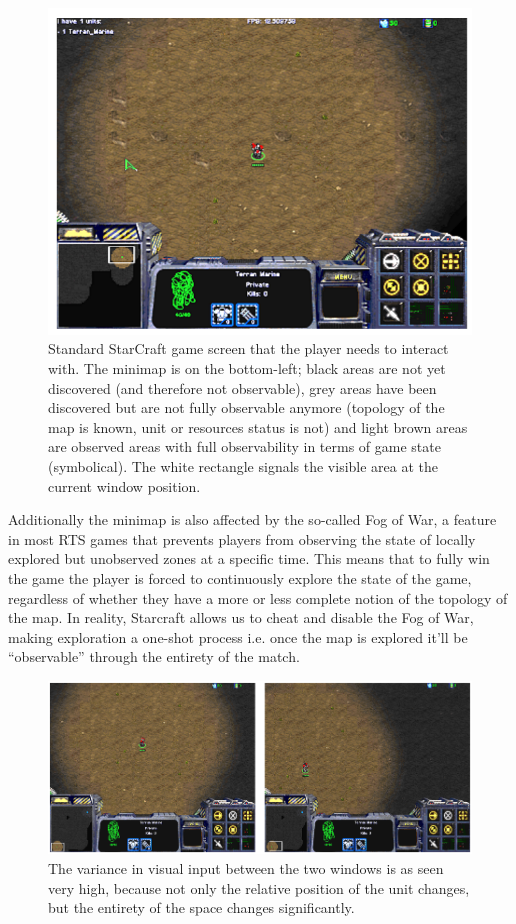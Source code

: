 \documentclass[bsc,frontabs,twoside,parskip,deptreport]{infthesis}     %
\begin{document}
\begin{figure}[h]
    \centering
    \includegraphics[width=\textwidth]{star_one}
    \caption{Standard StarCraft game screen that the player needs to interact
      with. The minimap is on the bottom-left; black areas are not yet
      discovered (and therefore not observable), grey areas have been discovered
      but are not fully observable anymore (topology of the map is known, unit
      or resources status is not) and light brown areas are observed areas with
      full observability in terms of game state (symbolical). The white
      rectangle signals the visible area at the current window position.}
    \label{fig:one_star}
\end{figure}

Additionally the minimap is also affected by the so-called Fog of War, a feature
in most RTS games that prevents players from observing the state of locally
explored but unobserved zones at a specific time. This means that to fully win
the game the player is forced to continuously explore the state of the game,
regardless of whether they have a more or less complete notion of the topology
of the map. In reality, Starcraft allows us to cheat and disable the Fog of War,
making exploration a one-shot process i.e. once the map is explored it’ll be
“observable” through the entirety of the match.

\begin{figure}[h]
    \centering
    \includegraphics[width=\textwidth]{double_star}
    \caption{The variance in visual input between the two windows is as seen
      very high, because not only the relative position of the unit changes, but
      the entirety of the space changes significantly.}
    \label{fig:double_star}
\end{figure}
\end{document}
